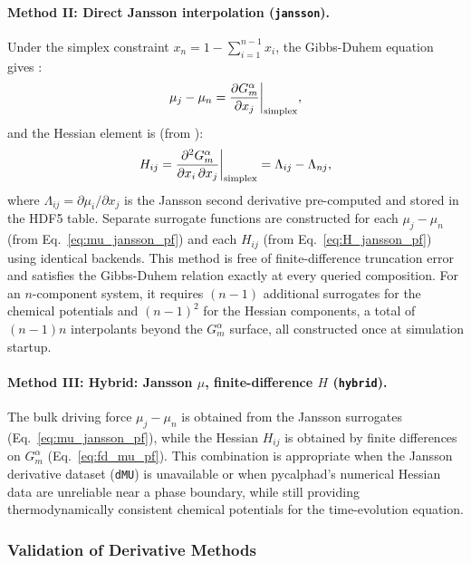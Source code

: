 \paragraph{Method II: Direct Jansson interpolation (\texttt{jansson}).}
Under the simplex constraint $x_n = 1 - \sum_{i=1}^{n-1} x_i$, the
Gibbs-Duhem equation gives \cite{deFontaine1979}:
%
\begin{equation}\label{eq:mu_jansson_pf}
    \mu_j - \mu_n
    = \frac{\partial G^\alpha_m}{\partial x_j}\bigg|_{\rm simplex},
\end{equation}
%
and the Hessian element is (from ):
%
\begin{equation}\label{eq:H_jansson_pf}
    H_{ij}
    = \frac{\partial^2 G^\alpha_m}{\partial x_i\,\partial x_j}\bigg|_{\rm simplex}
    = \Lambda_{ij} - \Lambda_{nj},
\end{equation}
%
where $\Lambda_{ij} = \partial\mu_i/\partial x_j$ is the
Jansson second derivative \cite{kunselman2024analytically}
pre-computed and stored in the HDF5 table.
Separate surrogate functions are constructed for each $\mu_j - \mu_n$
(from Eq.~\ref{eq:mu_jansson_pf}) and each $H_{ij}$ (from
Eq.~\ref{eq:H_jansson_pf}) using identical backends.  This method is
free of finite-difference truncation error and satisfies the
Gibbs-Duhem relation exactly at every queried composition.  For an
$n$-component system, it requires $(n-1)$ additional surrogates for
the chemical potentials and $(n-1)^2$ for the Hessian components, a total of $(n-1)n$ interpolants beyond the $G^\alpha_m$ surface,
all constructed once at simulation startup.

\paragraph{Method III: Hybrid: Jansson $\mu$, finite-difference $H$ (\texttt{hybrid}).}
The bulk driving force $\mu_j - \mu_n$ is obtained from the Jansson
surrogates (Eq.~\ref{eq:mu_jansson_pf}), while the Hessian $H_{ij}$
is obtained by finite differences on $G^\alpha_m$
(Eq.~\ref{eq:fd_mu_pf}).  This combination is appropriate when the
Jansson derivative dataset (\texttt{dMU}) is unavailable or when
pycalphad's numerical Hessian data are unreliable near a phase
boundary, while still providing thermodynamically consistent chemical
potentials for the time-evolution equation.

\subsubsection{Validation of Derivative Methods}

